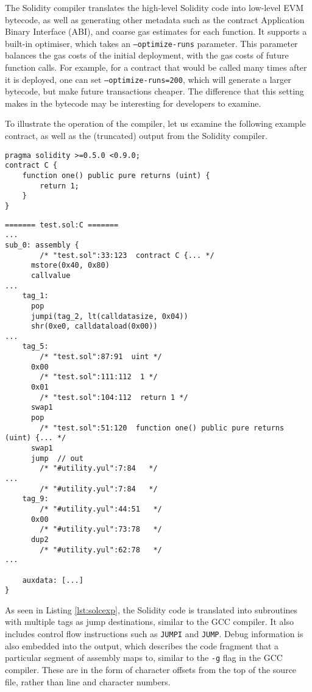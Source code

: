 The Solidity compiler translates the high-level Solidity code into low-level EVM bytecode,
as well as generating other metadata such as the contract Application Binary Interface (ABI),
and coarse gas estimates for each function. It supports a built-in optimiser, which
takes an \texttt{--optimize-runs} parameter. This parameter balances the gas costs of the
initial deployment, with the gas costs of future function calls. For example, for
a contract that would be called many times after it is deployed, one can set \texttt{--optimize-runs=200},
which will generate a larger bytecode, but make future transactions cheaper. The difference
that this setting makes in the bytecode may be interesting for developers to examine.

To illustrate the operation of the compiler, let us examine the following example contract,
as well as the (truncated) output from the Solidity compiler.\\

\begin{lstlisting}[language=Solidity, caption={An example Solidity contract}, label={lst:solcsolidityexp}, basicstyle=\ttfamily\scriptsize]
pragma solidity >=0.5.0 <0.9.0;
contract C {
    function one() public pure returns (uint) {
        return 1;
    }
}
\end{lstlisting}

\begin{lstlisting}[language=plantuml, caption={EVM assembly from the Solidity compiler}, label={lst:solcexp}, basicstyle=\ttfamily\scriptsize]
======= test.sol:C =======
...
sub_0: assembly {
        /* "test.sol":33:123  contract C {... */
      mstore(0x40, 0x80)
      callvalue
...
    tag_1:
      pop
      jumpi(tag_2, lt(calldatasize, 0x04))
      shr(0xe0, calldataload(0x00))
...
    tag_5:
        /* "test.sol":87:91  uint */
      0x00
        /* "test.sol":111:112  1 */
      0x01
        /* "test.sol":104:112  return 1 */
      swap1
      pop
        /* "test.sol":51:120  function one() public pure returns (uint) {... */
      swap1
      jump	// out
        /* "#utility.yul":7:84   */
...
        /* "#utility.yul":7:84   */
    tag_9:
        /* "#utility.yul":44:51   */
      0x00
        /* "#utility.yul":73:78   */
      dup2
        /* "#utility.yul":62:78   */
...

    auxdata: [...]
}
\end{lstlisting}

As seen in Listing \ref{lst:solcexp}, the Solidity code is translated into subroutines with
multiple tags as jump destinations, similar to the GCC compiler. It also includes control flow
instructions such as \texttt{JUMPI} and \texttt{JUMP}. Debug information is also
embedded into the output, which describes the code fragment that a particular segment of
assembly maps to, similar to the \texttt{-g} flag in the GCC compiler. These are in the 
form of character offsets from the top of the source file, rather than line and character 
numbers. 

